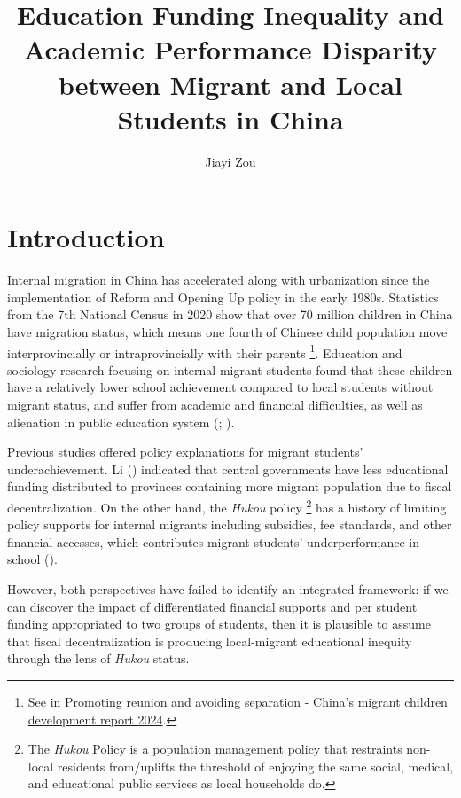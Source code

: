 \documentclass[
  man,
  floatsintext,
  longtable,
  nolmodern,
  notxfonts,
  notimes,
  colorlinks=true,linkcolor=blue,citecolor=blue,urlcolor=blue]{apa7}
\title{Education Funding Inequality and Academic Performance Disparity
between Migrant and Local Students in China}
\author{Jiayi Zou}
\affiliation{
{MA Program in the Social Sciences, University of Chicago}}
\begin{document}
\maketitle


\setcounter{secnumdepth}{-\maxdimen} %

\setlength\LTleft{0pt}


\section{Introduction}\label{introduction}

Internal migration in China has accelerated along with urbanization
since the implementation of Reform and Opening Up policy in the early
1980s. Statistics from the 7th National Census in 2020 show that over 70
million children in China have migration status, which means one fourth
of Chinese child population move interprovincially or intraprovincially
with their parents \footnote{See in
  \href{https://www.163.com/dy/article/JHFCU34705560ZWH.html}{Promoting
  reunion and avoiding separation - China's migrant children development
  report 2024}.}. Education and sociology research focusing on internal
migrant students found that these children have a relatively lower
school achievement compared to local students without migrant status,
and suffer from academic and financial difficulties, as well as
alienation in public education system
(;
).

Previous studies offered policy explanations for migrant students'
underachievement. Li ()
indicated that central governments have less educational funding
distributed to provinces containing more migrant population due to
fiscal decentralization. On the other hand, the \emph{Hukou} policy
\footnote{The \emph{Hukou} Policy is a population management policy that
  restraints non-local residents from/uplifts the threshold of enjoying
  the same social, medical, and educational public services as local
  households do.} has a history of limiting policy supports for internal
migrants including subsidies, fee standards, and other financial
accesses, which contributes migrant students' underperformance in school
().

However, both perspectives have failed to identify an integrated
framework: if we can discover the impact of differentiated financial
supports and per student funding appropriated to two groups of students,
then it is plausible to assume that fiscal decentralization is producing
local-migrant educational inequity through the lens of \emph{Hukou}
status.
\end{document}
